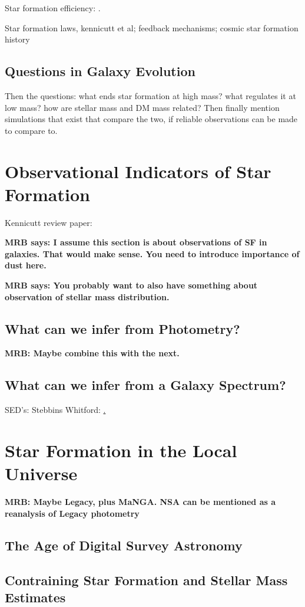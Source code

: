 Star formation efficiency: \citep{1538-3881-136-6-2782}.

Star formation laws, kennicutt et al; feedback mechanisms; cosmic star formation history

\subsection{Questions in Galaxy Evolution}
{Then the questions: what ends star formation at high mass?
what  regulates it at low mass? how are 
stellar mass and DM mass related? Then finally mention
simulations that exist that compare the two, if reliable
observations can be made to compare to.}

\section{Observational Indicators of Star Formation}

Kennicutt review paper: 

{\bf MRB says: I assume this section is about observations 
of SF in galaxies. That would make sense. You need to 
introduce importance of dust here.}

{\bf MRB says: You probably want to also have something
about observation of stellar mass distribution.}

\subsection{What can we infer from Photometry?}

{\bf MRB: Maybe combine this with the next.}

\subsection{What can we infer from a Galaxy Spectrum?}

SED's: Stebbins Whitford: \href{http://adsabs.harvard.edu/abs/1968ApJ...154...21O}.

\section{Star Formation in the Local Universe}

{\bf MRB: Maybe Legacy, plus MaNGA. NSA can be mentioned
as a reanalysis of Legacy photometry}

\subsection{The Age of Digital Survey Astronomy}

\subsection{Contraining Star Formation and Stellar Mass Estimates}



